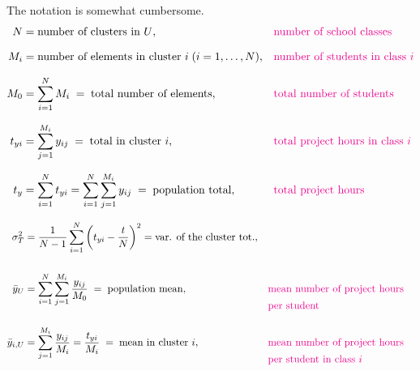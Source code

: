 \documentclass{my_eth_beamer}
\numberwithin{equation}{section}
\begin{document}
\begin{frame}
    \noindent The notation is somewhat \alert{cumbersome}.
    \begin{align*}
        N &= \text{number of clusters in $U$}, &&
            \text{\textcolor{magenta}{number of school classes}}\\[0.75em]
        M_i &= \text{number of elements in cluster $i$} \; (i=1,\ldots,N), &&
            \text{\textcolor{magenta}{number of students in class
            $i$}}\\[0.75em]
        M_0 &= \sum_{i=1}^N M_i \; = \; \text{total number of elements},
            && \text{\textcolor{magenta}{total number of students}}\\[0.75em]
        t_{yi} &= \sum_{j=1}^{M_i} y_{ij} \; = \; \text{total in cluster
            $i$},&& \text{\textcolor{magenta}{total project hours in class
            $i$}}\\[0.75em]
        t_y &= \sum_{i=1}^N t_{yi} = \sum_{i=1}^{N}\sum_{j=1}^{M_i} y_{ij}
            \; = \; \text{population total}, &&
            \text{\textcolor{magenta}{total project hours}}\\
    \end{align*}
\end{frame}

\begin{frame}
    \begin{align*}
        \sigma_T^2 & = \frac{1}{N - 1} \sum_{i = 1}^N \left(t_{yi} -
            \frac{t}{N}\right)^2 = \text{var. of the cluster tot.},\\[1.55em]
        \bar{y}_U &= \sum_{i = 1}^N \sum_{j = 1}^{M_i} \frac{y_{ij}}{M_0} \; = \;
            \text{population mean}, &&
            \text{\textcolor{magenta}{mean number of project hours}}\\[-1em]
            & && \text{\textcolor{magenta}{per student}}\\[1em]
        \bar{y}_{i,U} &= \sum_{j = 1}^{M_i} \frac{y_{ij}}{M_i} = \frac{t_{yi}}{M_i}
            \; = \; \text{mean in cluster $i$}, &&
            \text{\textcolor{magenta}{mean number of project hours}}\\[-1em]
            & && \text{\textcolor{magenta}{per student in class $i$}}
    \end{align*}
\end{frame}
\end{document}
